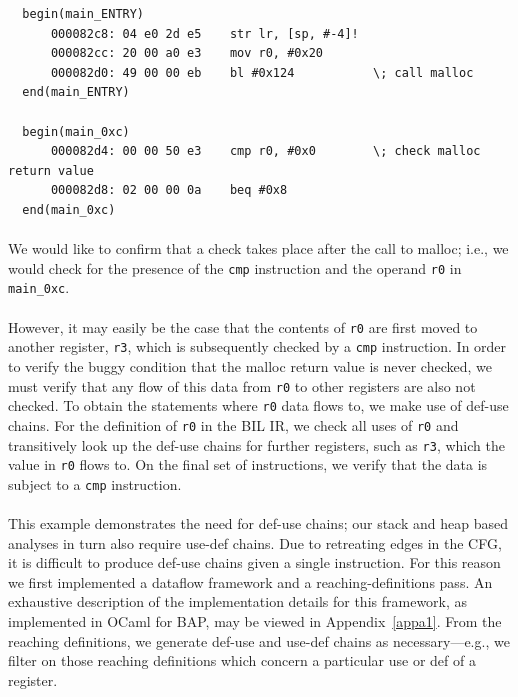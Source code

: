 \documentclass[letterpaper,11pt]{article}
\begin{document}
\begin{center}
\lstset{language=C, label=mallocdisasm,
caption=Malloc disassembly, breaklines=true, basicstyle=\tiny, numbers=none}
\begin{lstlisting}
  begin(main_ENTRY)
      000082c8: 04 e0 2d e5    str lr, [sp, #-4]!
      000082cc: 20 00 a0 e3    mov r0, #0x20
      000082d0: 49 00 00 eb    bl #0x124           \; call malloc
  end(main_ENTRY)

  begin(main_0xc)
      000082d4: 00 00 50 e3    cmp r0, #0x0        \; check malloc return value
      000082d8: 02 00 00 0a    beq #0x8
  end(main_0xc)
\end{lstlisting}
\label{fig:malloc}
\end{center}

\paragraph{}
We would like to confirm that a check takes place after the call to malloc;
i.e., we would check for the presence of the \texttt{cmp} instruction and the
operand \texttt{r0} in \texttt{main\_0xc}.

\paragraph{}
However, it may easily be the case that the contents of \texttt{r0} are first
moved to another register, \texttt{r3}, which is subsequently checked by a
\texttt{cmp} instruction. In order to verify the buggy condition that the malloc
return value is never checked, we must verify that any flow of this data from
\texttt{r0} to other registers are also not checked. To obtain the statements
where \texttt{r0} data flows to, we make use of def-use chains. For the
definition of \texttt{r0} in the BIL IR, we check all uses of \texttt{r0} and
transitively look up the def-use chains for further registers, such as
\texttt{r3}, which the value in \texttt{r0} flows to. On the final set of
instructions, we verify that the data is subject to a \texttt{cmp} instruction.

\paragraph{}
This example demonstrates the need for def-use chains; our stack and heap based
analyses in turn also require use-def chains. Due to retreating edges in the
CFG, it is difficult to produce def-use chains given a single instruction. For
this reason we first implemented a dataflow framework and a
reaching-definitions pass. An exhaustive description of the
implementation details for this framework, as implemented in OCaml for
BAP, may be viewed in Appendix~\ref{appa1}.
From the reaching definitions, we generate def-use
and use-def chains as necessary---e.g., we filter on those reaching definitions
which concern a particular use or def of a register.
\end{document}
